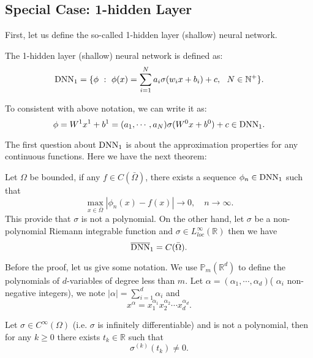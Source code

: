 \subsection{Special Case: 1-hidden Layer}
First, let us define the so-called 1-hidden layer (shallow) neural network.
\begin{definition}The 1-hidden layer (shallow) neural network is defined as:
	$$
	{\rm DNN}_1 = \lbrace \phi~:~ \phi(x) = \sum_{i=1}^N a_i \sigma(w_i x + b_i ) + c, ~~ N \in \mathbb{N}^+\rbrace.
	$$
\end{definition}

To consistent with above notation, we can write it as:
$$
\phi = W^1 x^1 + b^1 = (a_1,\cdots,a_N) \sigma(W^0 x + b^0) + c \in {\rm DNN}_1.
$$

The first question about ${\rm DNN}_1$ is about the approximation properties for any continuous functions. Here we have the next theorem:
\begin{theorem} Let $\Omega$ be bounded, if any $f\in C(\bar \Omega)$, there exists a sequence $\phi_n \in {\rm DNN}_1$ such that 
	$$
	\max_{x\in \bar \Omega} |\phi_n(x) - f(x)| \to 0, \quad n \to \infty.
	$$
	This provide that $\sigma$ is not a polynomial.
	On the other hand, let $\sigma$ be a non-polynomial Riemann integrable function and $\sigma\in L_{loc}^\infty(\mathbb{R})$ then we have
	$$
	\overline{\rm DNN}_1 = C(\bar \Omega).
	$$
\end{theorem}
Before the proof, let us give some notation.
We use $\mathbb{P}_m(\mathbb{R}^d)$ to define the polynomials
of $d$-variables of degree less than $m$. 
Let $\alpha = (\alpha_1,\cdots,\alpha_d)$( $\alpha_i $ non-negative integers), we note $|\alpha| = \sum_{i=1}^d \alpha_i$ and 
$$
x^{\alpha} = x_1^{\alpha_1}x_2^{\alpha_2}\cdots x_d^{\alpha_d}.
$$
\begin{lemma}\label{lemm:dsigma}
	Let $\sigma \in C^{\infty}(\Omega)$ (i.e. $\sigma$ is infinitely differentiable) and is not a polynomial, then for any $k \ge 0$ there exists $t_k \in \mathbb{R}$ such that 
	$$
	\sigma^{(k)}(t_k) \neq 0.
	$$
\end{lemma}

